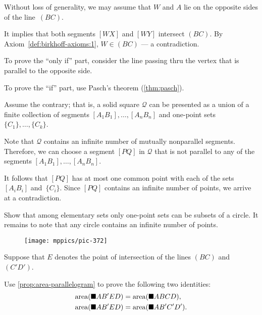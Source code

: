 \begin{multicols}{2}
Without loss of generality, we may assume that $W$ and $A$ lie on the opposite sides of the line~$(BC)$.

It implies that both segments $[WX]$ and $[WY]$ intersect $(BC)$.
By Axiom~\ref{def:birkhoff-axioms:1}, $W\in (BC)$ --- a contradiction.


To prove the ``only if'' part, consider the line passing thru the vertex that is parallel to the opposite side.

To prove the ``if'' part, use Pasch's theorem (\ref{thm:pasch}).

Assume the contrary; that is, a solid square $\mathcal{Q}$ can be presented as a union of a finite collection of segments $[A_1B_1],\dots,[A_nB_n]$
and one-point sets $\{C_1\},\dots,\{C_k\}$.

Note that $\mathcal{Q}$ contains an infinite number of mutually nonparallel segments.
Therefore, we can choose a segment $[PQ]$ in $\mathcal{Q}$ 
that is not parallel to any of the segments $[A_1B_1],\dots,[A_nB_n]$.

It follows that $[PQ]$ has at most one common point with each of the sets $[A_iB_i]$ and~$\{C_i\}$.
Since $[PQ]$ contains an infinite number of points, we arrive at a contradiction.

Show that among elementary sets
only one-point sets can be subsets of a circle.
It remains to note that any circle contains an infinite number of points.

{

\begin{wrapfigure}{r}{28mm}
\vskip-4mm
\centering
\texttt{[image: mppics/pic-372]}

\end{wrapfigure}

Suppose that $E$ denotes the point of intersection of the lines $(BC)$ and~$(C'D')$.

Use \ref{prop:area-parallelogram} to prove the following two identities:
\begin{align*}
\mathop{\rm area}\nolimits(\blacksquare AB'ED)
&=\mathop{\rm area}\nolimits(\blacksquare ABCD),
\\
\mathop{\rm area}\nolimits(\blacksquare AB'ED)
&=\mathop{\rm area}\nolimits(\blacksquare AB'C'D').
\end{align*}

}
\end{multicols}

